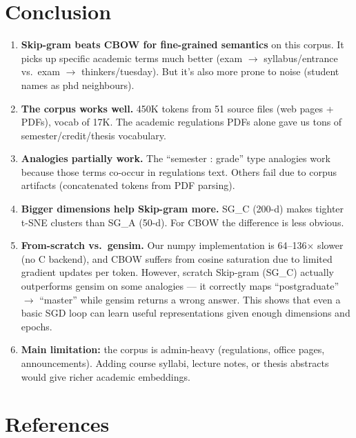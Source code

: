 \documentclass[11pt,a4paper]{article}
\begin{document}
\section{Conclusion}

\begin{enumerate}[leftmargin=2em]
  \item \textbf{Skip-gram beats CBOW for fine-grained semantics} on this corpus. It picks up specific academic terms much better (exam $\to$ syllabus/entrance vs.\ exam $\to$ thinkers/tuesday). But it's also more prone to noise (student names as phd neighbours).
  \item \textbf{The corpus works well.} 450K tokens from 51 source files (web pages + PDFs), vocab of 17K. The academic regulations PDFs alone gave us tons of semester/credit/thesis vocabulary.
  \item \textbf{Analogies partially work.} The ``semester : grade'' type analogies work because those terms co-occur in regulations text. Others fail due to corpus artifacts (concatenated tokens from PDF parsing).
  \item \textbf{Bigger dimensions help Skip-gram more.} SG\_C (200-d) makes tighter t-SNE clusters than SG\_A (50-d). For CBOW the difference is less obvious.
  \item \textbf{From-scratch vs.\ gensim.} Our numpy implementation is 64--136$\times$ slower (no C backend), and CBOW suffers from cosine saturation due to limited gradient updates per token. However, scratch Skip-gram (SG\_C) actually outperforms gensim on some analogies --- it correctly maps ``postgraduate'' $\to$ ``master'' while gensim returns a wrong answer. This shows that even a basic SGD loop can learn useful representations given enough dimensions and epochs.
  \item \textbf{Main limitation:} the corpus is admin-heavy (regulations, office pages, announcements). Adding course syllabi, lecture notes, or thesis abstracts would give richer academic embeddings.
\end{enumerate}

\newpage
\section*{References}
\end{document}
